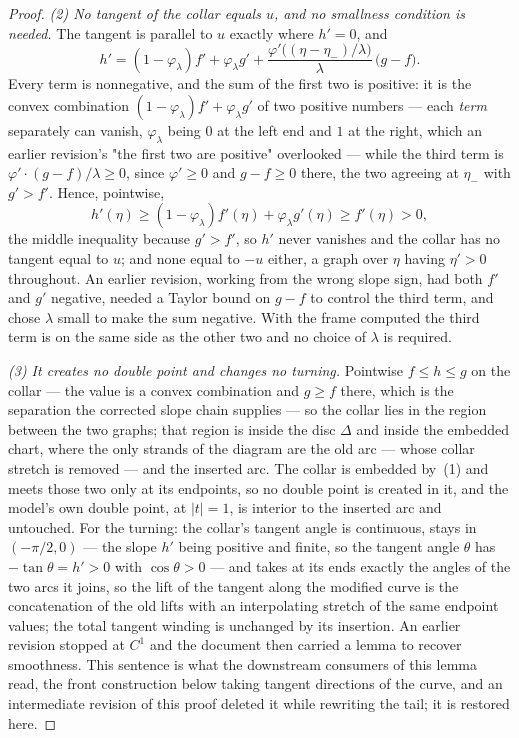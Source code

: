 \begin{proof}
\emph{(2) No tangent of the collar equals $u$, and no smallness condition is
needed.} The tangent is parallel to $u$ exactly where $h'=0$, and
\[
   h'=(1-\varphi_\lambda)f'+\varphi_\lambda g'
      +\frac{\varphi'\bigl((\eta-\eta_-)/\lambda\bigr)}{\lambda}\,
       \bigl(g-f\bigr).
\]
Every term is nonnegative, and the sum of the first two is positive: it is the
convex combination $(1-\varphi_\lambda)f'+\varphi_\lambda g'$ of two positive
numbers --- each \emph{term} separately can vanish, $\varphi_\lambda$ being $0$
at the left end and $1$ at the right, which an earlier revision's "the first
two are positive" overlooked --- while the third term is
$\varphi'\cdot(g-f)/\lambda\geq0$, since $\varphi'\geq0$ and $g-f\geq0$ there,
the two agreeing at $\eta_-$ with $g'>f'$. Hence, pointwise,
\[
   h'(\eta)\geq(1-\varphi_\lambda)f'(\eta)+\varphi_\lambda g'(\eta)
   \geq f'(\eta)>0 ,
\]
the middle inequality because $g'>f'$, so $h'$ never vanishes and the collar
has no tangent equal to $u$; and none equal to $-u$ either, a graph over $\eta$ having
$\eta'>0$ throughout. An earlier revision, working from the wrong slope sign,
had both $f'$ and $g'$ negative, needed a Taylor bound on $g-f$ to control the
third term, and chose $\lambda$ small to make the sum negative. With the frame
computed the third term is on the same side as the other two and no choice of
$\lambda$ is required.

\emph{(3) It creates no double point and changes no turning.} Pointwise
$f\leq h\leq g$ on the collar --- the value is a convex combination and $g\geq f$
there, which is the separation the corrected slope chain supplies --- so the
collar lies in the region between the two graphs; that region is inside the
disc $\Delta$ and inside the embedded chart, where the only strands of the
diagram are the old arc --- whose collar stretch is removed --- and the inserted
arc. The collar is embedded by~(1) and meets those two only at its endpoints,
so no double point is created in it, and the model's own double point, at
$|t|=1$, is interior to the inserted arc and untouched. For the turning: the
collar's tangent angle is continuous, stays in $(-\pi/2,0)$ --- the slope
$h'$ being positive and finite, so the tangent angle $\theta$ has
$-\tan\theta=h'>0$ with $\cos\theta>0$ --- and takes at its ends exactly the
angles of the two arcs it joins, so the lift of the tangent
along the modified curve is the concatenation of the old lifts with an
interpolating stretch of the same endpoint values; the total tangent winding is
unchanged by its insertion. An earlier revision stopped at $C^1$
and the document then carried a lemma to recover smoothness. This sentence is what the downstream consumers of this
lemma read, the front construction below taking tangent directions of the
curve, and an intermediate revision of this proof deleted it while rewriting
the tail; it is restored here.


\end{proof}
